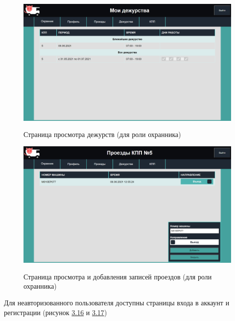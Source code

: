 \begin{figure}[h!] \label{guard_duty_sc}
	\begin{center}
		{\includegraphics[scale=0.4, angle=0]{sc/guard_duty}}
		\caption{Страница просмотра дежурств (для роли охранника)}
	\end{center}
\end{figure}

\begin{figure}[h!] \label{pass_guard_sc}
	\begin{center}
		{\includegraphics[scale=0.4, angle=0]{sc/pass_guard}}
		\caption{Страница просмотра и добавления записей проездов (для роли охранника)}
	\end{center}
\end{figure}

\newpage
Для неавторизованного пользователя доступны страницы входа в аккаунт и регистрации (рисунок \hyperref[login_sc]{3.16} и \hyperref[signup_sc]{3.17}) 

